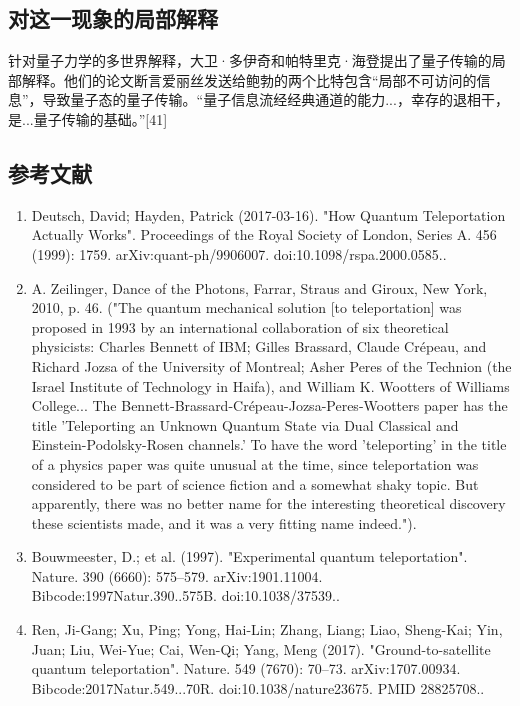 \subsection{对这一现象的局部解释}

针对量子力学的多世界解释，大卫·多伊奇和帕特里克·海登提出了量子传输的局部解释。他们的论文断言爱丽丝发送给鲍勃的两个比特包含“局部不可访问的信息”，导致量子态的量子传输。“量子信息流经经典通道的能力...，幸存的退相干，是...量子传输的基础。”[41]

\subsection{参考文献}

\begin{enumerate}
\item Deutsch, David; Hayden, Patrick (2017-03-16). "How Quantum Teleportation Actually Works". Proceedings of the Royal Society of London, Series A. 456 (1999): 1759. arXiv:quant-ph/9906007. doi:10.1098/rspa.2000.0585..
\item A. Zeilinger, Dance of the Photons, Farrar, Straus and Giroux, New York, 2010, p. 46. ("The quantum mechanical solution [to teleportation] was proposed in 1993 by an international collaboration of six theoretical physicists: Charles Bennett of IBM; Gilles Brassard, Claude Crépeau, and Richard Jozsa of the University of Montreal; Asher Peres of the Technion (the Israel Institute of Technology in Haifa), and William K. Wootters of Williams College... The Bennett-Brassard-Crépeau-Jozsa-Peres-Wootters paper has the title 'Teleporting an Unknown Quantum State via Dual Classical and Einstein-Podolsky-Rosen channels.' To have the word 'teleporting' in the title of a physics paper was quite unusual at the time, since teleportation was considered to be part of science fiction and a somewhat shaky topic. But apparently, there was no better name for the interesting theoretical discovery these scientists made, and it was a very fitting name indeed.").
\item Bouwmeester, D.; et al. (1997). "Experimental quantum teleportation". Nature. 390 (6660): 575–579. arXiv:1901.11004. Bibcode:1997Natur.390..575B. doi:10.1038/37539..
\item Ren, Ji-Gang; Xu, Ping; Yong, Hai-Lin; Zhang, Liang; Liao, Sheng-Kai; Yin, Juan; Liu, Wei-Yue; Cai, Wen-Qi; Yang, Meng (2017). "Ground-to-satellite quantum teleportation". Nature. 549 (7670): 70–73. arXiv:1707.00934. Bibcode:2017Natur.549...70R. doi:10.1038/nature23675. PMID 28825708..

\end{enumerate}

